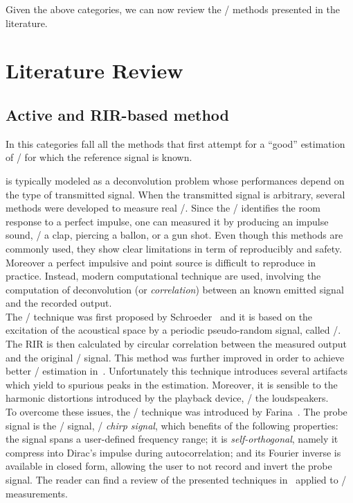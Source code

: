 \mynewline
Given the above categories, we can now review the \AER/ methods presented in the literature.

\section{Literature Review}\label{sec:estimation:sota}

\subsection{Active and RIR-based method}
In this categories fall all the methods that first attempt for a ``good'' estimation of \RIRs/ for which the reference signal is known.

 is typically modeled as a deconvolution problem whose performances depend on the type of transmitted signal.
When the transmitted signal is arbitrary, several methods were developed to measure real \RIRs/.
Since the \RIR/ identifies the room response to a perfect impulse, one can measured it by producing an impulse sound, \eg/ a clap, piercing a ballon, or a gun shot.
Even though this methods are commonly used, they show clear limitations in term of reproducibly and safety.
Moreover a perfect impulsive and point source is difficult to reproduce in practice.
Instead, modern computational technique are used, involving the computation of deconvolution (or \textit{correlation}) between an known emitted signal and the recorded output.
\\The \MLSdef/ technique was first proposed by Schroeder~ and it is based on the excitation of the acoustical space by a periodic pseudo-random signal, called \MLS/.
The RIR is then calculated by circular correlation between the measured output and the original \MLS/ signal.
This method was further improved in order to achieve better \RIR/ estimation in~.
Unfortunately this technique introduces several artifacts which yield to spurious peaks in the estimation.
Moreover, it is sensible to the harmonic distortions introduced by the playback device, \eg/ the loudspeakers.
\\To overcome these issues, the \ESSdef/ technique was introduced by Farina~.
The probe signal is the \ESS/ signal, \aka/ \textit{chirp signal}, which benefits of the following properties:
the signal spans a user-defined frequency range; it is \textit{self-orthogonal}, namely it compress into Dirac's impulse during autocorrelation;
and its Fourier inverse is available in closed form, allowing the user to not record and invert the probe signal.
The reader can find a review of the presented techniques in~ applied to \RIR/ measurements.

